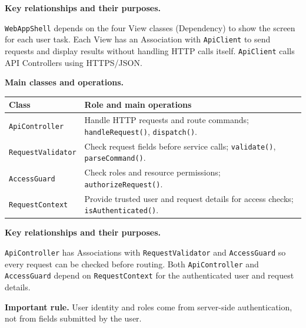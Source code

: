 \documentclass[10pt,letterpaper]{article}
\begin{document}
\noindent\textbf{Key relationships and their purposes.}\par\smallskip
\texttt{WebAppShell} depends on the four View classes (Dependency) to
show the screen for each user task. Each View has an Association with
\texttt{ApiClient} to send requests and display results without handling
HTTP calls itself. \texttt{ApiClient} calls API Controllers using HTTPS/JSON.



\noindent\textbf{Main classes and operations.}\par\smallskip
\begingroup\small
\begin{tabularx}{\textwidth}{|L{0.37\textwidth}|Y|}
\hline
\textbf{Class} & \textbf{Role and main operations} \\ \hline
\texttt{ApiController} & Handle HTTP requests and route commands; \texttt{handleRequest()}, \texttt{dispatch()}. \\ \hline
\texttt{RequestValidator} & Check request fields before service calls; \texttt{validate()}, \texttt{parseCommand()}. \\ \hline
\texttt{AccessGuard} & Check roles and resource permissions; \texttt{authorizeRequest()}. \\ \hline
\texttt{RequestContext} & Provide trusted user and request details for access checks; \texttt{isAuthenticated()}. \\ \hline
\end{tabularx}
\endgroup

\noindent\textbf{Key relationships and their purposes.}\par\smallskip
\texttt{ApiController} has Associations with \texttt{RequestValidator}
and \texttt{AccessGuard} so every request can be checked before routing.
Both \texttt{ApiController} and \texttt{AccessGuard} depend on
\texttt{RequestContext} for the authenticated user and request details.

\noindent\textbf{Important rule.} User identity and roles come from server-side
authentication, not from fields submitted by the user.
\end{document}
